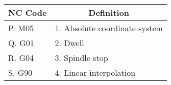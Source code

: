 \begin{tabular}{|l|l|}
\hline
\multicolumn{1}{|c|}{\textbf{NC Code}}    & \multicolumn{1}{|c|}{\textbf{Definition}} \\
\hline
P. M05 &1. Absolute coordinate system\\
\hline
Q. G01 &2. Dwell\\
\hline
R. G04 &3. Spindle stop\\
\hline
S. G90 &4. Linear interpolation\\
\hline
\end{tabular}
